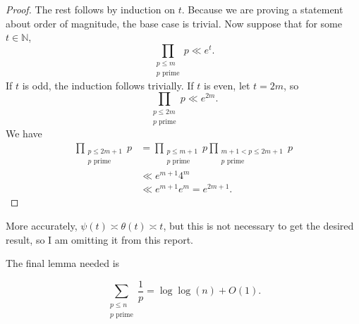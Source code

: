\documentclass[12pt]{amsart}
\begin{document}
\begin{proof}
The rest follows by induction on \(t\). Because we are proving
a statement about order of magnitude, the base case is trivial. Now suppose that
for some \(t \in \mathbb{N} \),
\[
    \prod _{\substack{ p \leq m \\p \text{ prime}  }} p \ll e^{t}
.\]
If \(t\) is odd, the induction follows trivially. If \(t\) is even, let \(t = 2m\),
so
\[
    \prod  _{\substack{ p \leq 2m \\ p \text{ prime}  }} p\ll e^{2m}
.\]
We have
\begin{align*}
\prod _{\substack{ p \leq 2m + 1 \\ p \text{ prime}  }} p & = \prod _{\substack{ p \leq m + 1 \\ p \text{ prime}  }} p \prod _{\substack{ m + 1 < p \leq 2m + 1 \\ p \text{ prime}  }} p \\
& \ll e^{m + 1} 4^{m} \\
& \ll e^{m+1} e^{m} = e^{2m+1}. 
\end{align*}
\end{proof}

More accurately, \(\psi(t) \asymp \theta(t) \asymp t\), but this is not necessary to get the desired result,
so I am omitting it from this report.

The final lemma needed is
\begin{lemma*}
\[
    \sum _{\substack{ p \leq n \\ p\text{ prime}  }} \frac{1}{p}  = \log\log \left( n \right) + O(1)
.\]
\end{lemma*}
\end{document}
